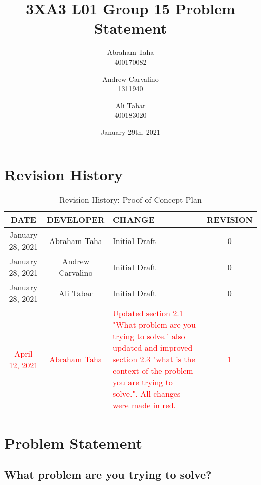 \documentclass[11pt, oneside]{article}   	%
\title{3XA3 L01 Group 15 Problem Statement
}
\author{Abraham Taha\\
		400170082
		\and
		Andrew Carvalino\\
		1311940
		\and
		Ali Tabar\\
		400183020}
\date{January 29th, 2021}							%
\begin{document}
\maketitle
\newpage
\tableofcontents
\newpage

\section{Revision History}

\begin{table}[hp]
\caption{Revision History: Proof of Concept Plan}
\begin{center}
\label{tab:}
\begin{tabular}{|c|c|p{5cm}|c|}
\hline
\textbf{DATE} & \textbf{DEVELOPER} & \textbf{CHANGE} & \textbf{REVISION}\\
\hline
January 28, 2021 & Abraham Taha & Initial Draft & 0\\
\hline
January 28, 2021 & Andrew Carvalino & Initial Draft & 0\\
\hline
January 28, 2021 & Ali Tabar & Initial Draft & 0\\
\hline
\textcolor{red}{April 12, 2021} & \textcolor{red}{Abraham Taha} & \textcolor{red}{Updated section 2.1 "What problem are you trying to solve." also updated and improved section 2.3 "what is the context of the problem you are trying to solve.". All changes were made in red.} & \textcolor{red}{1}\\
\hline
\end{tabular}
\end{center}
\label{default}
\end{table}


\newpage
\section{Problem Statement}
\subsection{What problem are you trying to solve?}
\end{document}
